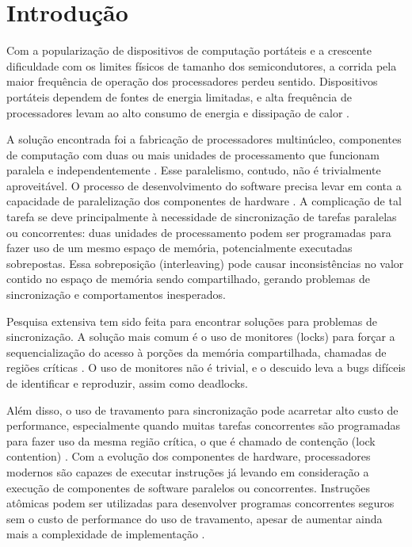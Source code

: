 \documentclass[a4paper,12pt,oldfontcommands]{abntex2}
\begin{document}
\cleardoublepage

\tableofcontents


\textual
{}

\chapter{Introdução}

Com a popularização de dispositivos de computação portáteis e a crescente dificuldade com os limites físicos de tamanho dos semicondutores, a corrida pela maior frequência de operação dos processadores perdeu sentido. Dispositivos portáteis dependem de fontes de energia limitadas, e alta frequência de processadores levam ao alto consumo de energia e dissipação de calor \cite{schone2012memory}.

A solução encontrada foi a fabricação de processadores multinúcleo, componentes de computação com duas ou mais unidades de processamento que funcionam paralela e independentemente \cite{kataoka2015power}. Esse paralelismo, contudo, não é trivialmente aproveitável. O processo de desenvolvimento do software precisa levar em conta a capacidade de paralelização dos componentes de hardware \cite{hoare1972towards}.  
A complicação de tal tarefa se deve principalmente à necessidade de sincronização de tarefas paralelas ou concorrentes: duas unidades de processamento podem ser programadas para fazer uso de um mesmo espaço de memória, potencialmente executadas sobrepostas. Essa sobreposição (interleaving) pode causar inconsistências no valor contido no espaço de memória sendo compartilhado, gerando problemas de sincronização e comportamentos inesperados.

Pesquisa extensiva tem sido feita para encontrar soluções para problemas de sincronização. A solução mais comum é o uso de monitores (locks) para forçar a sequencialização do acesso à porções da memória compartilhada, chamadas de regiões críticas \cite{tallent2010analyzing}. O uso de monitores não é trivial, e o descuido leva a bugs difíceis de identificar e reproduzir, assim como deadlocks.

Além disso, o uso de travamento para sincronização pode acarretar alto custo de performance, especialmente quando muitas tarefas concorrentes são programadas para fazer uso da mesma região crítica, o que é chamado de contenção (lock contention) \cite{tallent2010analyzing}. Com a evolução dos componentes de hardware, processadores modernos são capazes de executar instruções já levando em consideração a execução de componentes de software paralelos ou concorrentes. Instruções atômicas podem ser utilizadas para desenvolver programas concorrentes seguros sem o custo de performance do uso de travamento, apesar de aumentar ainda mais a complexidade de implementação \cite{michael1998nonblocking}.
\end{document}
